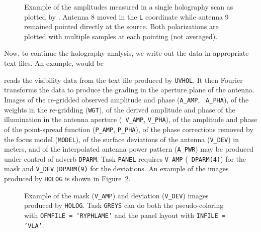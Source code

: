 \begin{figure}
\centering
{}
\caption[Example holography raster]{Example of the amplitudes measured
in a single holography scan as plotted by {\tt {}}\@.
Antenna 8 moved in the {\tt L} coordinate while antenna 9 remained
pointed directly at the source.  Both polarizations are plotted with
multiple samples at each pointing (not averaged).}
\label{fig:uvhol}
\end{figure}

Now, to continue the holography analysis, we write out the data in
appropriate text files.  An example, would be

     {\tt {}} reads the visibility data from the text file
produced by {\tt UVHOL}\@.  It then Fourier transforms the data to
produce the grading in the aperture plane of the antenna.  Images of
the re-gridded observed amplitude and phase ({\tt A\_AMP}, {\tt
A\_PHA}), of the weights in the re-gridding ({\tt WGT}), of the derived
amplitude and phase of the illumination in the antenna aperture ({\tt
V\_AMP}, {\tt V\_PHA}), of the amplitude and phase of the point-spread
function ({\tt P\_AMP}, {\tt P\_PHA}), of the phase corrections removed
by the focus model ({\tt MODEL}), of the surface deviations of the
antenna ({\tt V\_DEV}) in meters, and of the interpolated antenna
power pattern ({\tt A\_PWR}) may be produced under control of adverb
{\tt DPARM}\@.  Task {\tt PANEL} requires {\tt V\_AMP} ({\tt
DPARM(4)}) for the mask and {\tt V\_DEV} ({\tt DPARM(9)} for the
deviations.  An example of the images produced by {\tt HOLOG} is shown
in Figure~\ref{fig:holog}.

\begin{figure}
\centering
{}
\caption[Example {\tt HOLOG} images]{Example of the mask ({\tt V\_AMP})
and deviation ({\tt V\_DEV}) images produced by {\tt HOLOG}\@.  Task
{\tt GREYS} can do both the pseudo-coloring with {\tt OFMFILE =
'RYPHLAME'} and the panel layout with {\tt INFILE = 'VLA'}\@.}
\label{fig:holog}
\end{figure}

